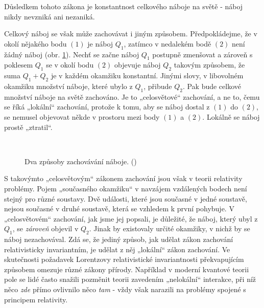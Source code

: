     Důsledkem tohoto zákona je konstantnost celkového náboje na světě - náboj nikdy nevzniká ani
    nezaniká.
    
    Celkový náboj se však může zachovávat i jiným způsobem. Předpokládejme, že v okolí nějakého bodu
    \((1)\) je náboj \(Q_1\), zatímco v nedalekém bodě \((2)\) není žádný náboj (obr.
    \ref{fyz:fig0609}). Nechť se začne náboj \(Q_1\) postupně zmenšovat a zároveň s poklesem \(Q_1\)
    se v okolí bodu \((2)\) objevuje náboj \(Q_2\) takovým způsobem, že suma \(Q_1 + Q_2\) je v
    každém okamžiku konstantní. Jinými slovy, v libovolném okamžiku množství náboje, které ubylo z
    \(Q_1\), přibude \(Q_2\). Pak bude celkové množství náboje na světě zachováno. Je to
    „celosvětové“ zachování, a ne to, čemu se říká „lokální“ zachování, protože k tomu, aby se náboj
    dostal z \((1)\) do \((2)\), se nemusel objevovat někde v prostoru mezi body \((1)\) a \((2)\).
    Lokálně se náboj prostě „ztratil“.

    \begin{figure}[ht!]   %
      \centering
        {}  \\
        {} 
      \caption{Dva způsoby zachovávání náboje. (\cite[s.~493]{Feynman02})}
      \label{fyz:fig0609}
    \end{figure}

    S takovýmto „celosvětovým“ zákonem zachování jsou však v teorii relativity problémy. Pojem
    „současného okamžiku“ v navzájem vzdálených bodech není stejný pro různé soustavy. Dvě události,
    které jsou současné v jedné soustavě, nejsou současné v druhé soustavě, která se vzhledem k
    první pohybuje. V „celosvětovém“ zachování, jak jsme jej popsali, je důležité, že náboj, který
    ubyl z \(Q_1\), se \emph{zároveň} objevil v \(Q_2\). Jinak by existovaly určité okamžiky, v
    nichž by se náboj nezachovával. Zdá se, že jediný způsob, jak udělat zákon zachování
    relativisticky invariantním, je udělat z něj „lokální“ zákon zachování. Ve skutečnosti požadavek
    Lorentzovy relativistické invariantnosti překvapujícím způsobem omezuje různé zákony přírody.
    Například v moderní kvantové teorii pole se lidé často snažili pozměnit teorii zavedením
    „nelokální“ interakce, při níž něco \emph{zde} přímo ovlivnilo něco \emph{tam} - vždy však
    narazili na problémy spojené s principem relativity.

